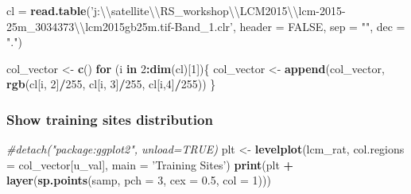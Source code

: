 \documentclass[]{article}
\newenvironment{Shaded}{\begin{snugshade}}{\end{snugshade}}
\newcommand{\CharTok}[1]{\textcolor[rgb]{0.31,0.60,0.02}{#1}}
\newcommand{\CommentTok}[1]{\textcolor[rgb]{0.56,0.35,0.01}{\textit{#1}}}
\newcommand{\ControlFlowTok}[1]{\textcolor[rgb]{0.13,0.29,0.53}{\textbf{#1}}}
\newcommand{\DataTypeTok}[1]{\textcolor[rgb]{0.13,0.29,0.53}{#1}}
\newcommand{\DecValTok}[1]{\textcolor[rgb]{0.00,0.00,0.81}{#1}}
\newcommand{\FloatTok}[1]{\textcolor[rgb]{0.00,0.00,0.81}{#1}}
\newcommand{\KeywordTok}[1]{\textcolor[rgb]{0.13,0.29,0.53}{\textbf{#1}}}
\newcommand{\NormalTok}[1]{#1}
\newcommand{\OperatorTok}[1]{\textcolor[rgb]{0.81,0.36,0.00}{\textbf{#1}}}
\newcommand{\OtherTok}[1]{\textcolor[rgb]{0.56,0.35,0.01}{#1}}
\newcommand{\StringTok}[1]{\textcolor[rgb]{0.31,0.60,0.02}{#1}}
\begin{document}
\begin{Shaded}
\begin{Highlighting}[]
\NormalTok{cl =}\StringTok{ }\KeywordTok{read.table}\NormalTok{(}\StringTok{'j:}\CharTok{\textbackslash{}\textbackslash{}}\StringTok{satellite}\CharTok{\textbackslash{}\textbackslash{}}\StringTok{RS_workshop}\CharTok{\textbackslash{}\textbackslash{}}\StringTok{LCM2015}\CharTok{\textbackslash{}\textbackslash{}}\StringTok{lcm-2015-25m_3034373}\CharTok{\textbackslash{}\textbackslash{}}\StringTok{lcm2015gb25m.tif-Band_1.clr'}\NormalTok{, }\DataTypeTok{header =} \OtherTok{FALSE}\NormalTok{, }\DataTypeTok{sep =} \StringTok{""}\NormalTok{, }\DataTypeTok{dec =} \StringTok{"."}\NormalTok{)}

\NormalTok{col_vector <-}\StringTok{ }\KeywordTok{c}\NormalTok{()}
\ControlFlowTok{for}\NormalTok{ (i }\ControlFlowTok{in} \DecValTok{2}\OperatorTok{:}\KeywordTok{dim}\NormalTok{(cl)[}\DecValTok{1}\NormalTok{])\{}
\NormalTok{  col_vector <-}\StringTok{ }\KeywordTok{append}\NormalTok{(col_vector, }\KeywordTok{rgb}\NormalTok{(cl[i, }\DecValTok{2}\NormalTok{]}\OperatorTok{/}\DecValTok{255}\NormalTok{, cl[i, }\DecValTok{3}\NormalTok{]}\OperatorTok{/}\DecValTok{255}\NormalTok{, cl[i,}\DecValTok{4}\NormalTok{]}\OperatorTok{/}\DecValTok{255}\NormalTok{))}
\NormalTok{\}}
\end{Highlighting}
\end{Shaded}

\hypertarget{show-training-sites-distribution}{%
\subsubsection{Show training sites
distribution}\label{show-training-sites-distribution}}

\begin{Shaded}
\begin{Highlighting}[]
\CommentTok{#detach("package:ggplot2", unload=TRUE)}
\NormalTok{plt <-}\StringTok{ }\KeywordTok{levelplot}\NormalTok{(lcm_rat, }\DataTypeTok{col.regions =}\NormalTok{ col_vector[u_val], }\DataTypeTok{main =} \StringTok{'Training Sites'}\NormalTok{)}
\KeywordTok{print}\NormalTok{(plt }\OperatorTok{+}\StringTok{ }\KeywordTok{layer}\NormalTok{(}\KeywordTok{sp.points}\NormalTok{(samp, }\DataTypeTok{pch =} \DecValTok{3}\NormalTok{, }\DataTypeTok{cex =} \FloatTok{0.5}\NormalTok{, }\DataTypeTok{col =} \DecValTok{1}\NormalTok{)))}
\end{Highlighting}
\end{Shaded}
\end{document}
